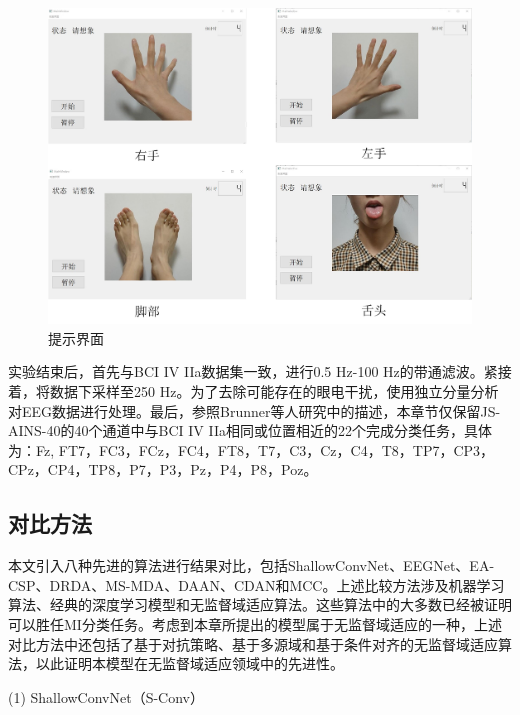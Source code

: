 \begin{figure}[h]
	\centering
	\includegraphics[width=0.57\textheight]{figures/运动想象实验.jpg}
	\caption{提示界面} 
	\label{fig_4_3}
\end{figure}

实验结束后，首先与BCI IV IIa数据集一致，进行0.5 Hz-100 Hz的带通滤波。紧接着，将数据下采样至250 Hz。为了去除可能存在的眼电干扰，使用独立分量分析\cite{4-29}对EEG数据进行处理。最后，参照Brunner等人研究\cite{4-10}中的描述，本章节仅保留JS-AINS-40的40个通道中与BCI IV IIa相同或位置相近的22个完成分类任务，具体为：Fz, FT7，FC3，FCz，FC4，FT8，T7，C3，Cz，C4，T8，TP7，CP3，CPz，CP4，TP8，P7，P3，Pz，P4，P8，Poz。




\subsection{对比方法}
本文引入八种先进的算法进行结果对比，包括ShallowConvNet\cite{4-11}、EEGNet\cite{4-2}、EA-CSP\cite{4-15}、DRDA\cite{4-16}、MS-MDA\cite{4-17}、DAAN\cite{4-18}、CDAN\cite{4-19}和MCC\cite{4-20}。上述比较方法涉及机器学习算法、经典的深度学习模型和无监督域适应算法。这些算法中的大多数已经被证明可以胜任MI分类任务。考虑到本章所提出的模型属于无监督域适应的一种，上述对比方法中还包括了基于对抗策略、基于多源域和基于条件对齐的无监督域适应算法，以此证明本模型在无监督域适应领域中的先进性。

(1) ShallowConvNet（S-Conv）

